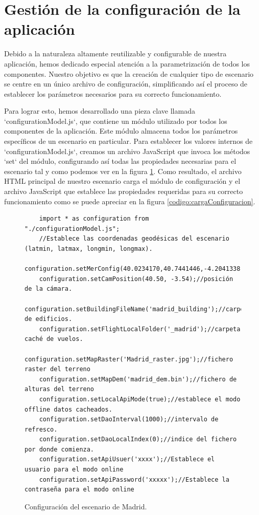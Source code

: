 \documentclass[a4paper, 11pt]{book}
\begin{document}
\clearpage
\section{Gestión de la configuración de la aplicación}
\label{sec:configuration}
Debido a la naturaleza altamente reutilizable y configurable de nuestra aplicación, hemos dedicado especial atención a la parametrización de todos los componentes. Nuestro objetivo es que la creación de cualquier tipo de escenario se centre en un único archivo de configuración, simplificando así el proceso de establecer los parámetros necesarios para su correcto funcionamiento.

Para lograr esto, hemos desarrollado una pieza clave llamada `configurationModel.js`, que contiene un módulo utilizado por todos los componentes de la aplicación. Este módulo almacena todos los parámetros específicos de un escenario en particular. Para establecer los valores internos de `configurationModel.js`, creamos un archivo JavaScript que invoca los métodos `set` del módulo, configurando así todas las propiedades necesarias para el escenario tal y como podemos ver en la figura \ref{codigo:madridConf}. Como resultado, el archivo HTML principal de nuestro escenario carga el módulo de configuración y el archivo JavaScript que establece las propiedades requeridas para su correcto funcionamiento como se puede apreciar en la figura \ref{codigo:cargaConfiguracion}.
\begin{figure}[H]
\centering
\begin{verbatim}
    import * as configuration from "./configurationModel.js";
    //Establece las coordenadas geodésicas del escenario (latmin, latmax, longmin, longmax).
    configuration.setMerConfig(40.0234170,40.7441446,-4.2041338,-3.2538165);
    configuration.setCamPosition(40.50, -3.54);//posición de la cámara.
    configuration.setBuildingFileName('madrid_building');//carpeta de edificios.
    configuration.setFlightLocalFolder('_madrid');//carpeta caché de vuelos.
    configuration.setMapRaster('Madrid_raster.jpg');//fichero raster del terreno
    configuration.setMapDem('madrid_dem.bin');//fichero de alturas del terreno
    configuration.setLocalApiMode(true);//establece el modo offline datos cacheados.
    configuration.setDaoInterval(1000);//intervalo de refresco.
    configuration.setDaoLocalIndex(0);//indice del fichero por donde comienza.
    configuration.setApiUsuer('xxxx');//Establece el usuario para el modo online
    configuration.setApiPassword('xxxxx');//Establece la contraseña para el modo online
\end{verbatim}
\caption{Configuración del escenario de Madrid.
\label{codigo:madridConf}}
\end{figure}
\end{document}
